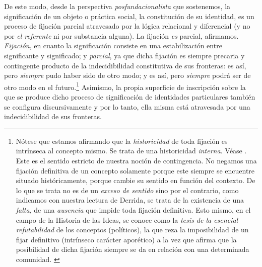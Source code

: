 De este modo, desde la perspectiva \emph{posfundacionalista} que sostenemos, la significación de un objeto o práctica social, la constitución de su identidad, es un proceso de fijación parcial atravesado por la lógica relacional y diferencial (y no por \emph{el referente} ni por substancia alguna). La fijación \emph{es} parcial, afirmamos. \emph{Fijación}, en cuanto la significación consiste en una estabilización entre significante y significado; y \emph{parcial}, ya que dicha fijación es siempre precaria y contingente producto de la indecidibilidad constitutiva de sus fronteras: es así, pero \emph{siempre} pudo haber sido de otro modo; y es así, pero \emph{siempre} podrá ser de otro modo en el futuro.\footnote{Nótese que estamos afirmando que la \emph{historicidad} de toda fijación es intrínseca al concepto mismo. Se trata de una historicidad \emph{interna}. Véase \cite[][]{@7028-BISET2010}. Este es el sentido estricto de nuestra noción de contingencia. No negamos una fijación definitiva de un concepto solamente porque este siempre se encuentre situado históricamente, porque cambie su sentido en función del contexto. De lo que se trata no es de un \emph{exceso de sentido} sino por el contrario, como indicamos con nuestra lectura de Derrida, se trata de la existencia de una \emph{falta}, de una \emph{ausencia} que impide toda fijación definitiva. Esto mismo, en el campo de la Historia de las Ideas, se conoce como la \emph{tesis de la esencial refutabilidad} de los conceptos (políticos), la que reza la imposibilidad de un fijar definitivo (intrínseco carácter aporético) a la vez que afirma que la posibilidad de dicha fijación siempre se da en relación con una determinada comunidad. \cite[Véase][245-253]{@7026-PALTI2007}} Asimismo, la propia superficie de inscripción sobre la que se produce dicho proceso de significación de identidades particulares también se configura discursivamente y por lo tanto, ella misma está atravesada por una indecidibilidad de sus fronteras.

